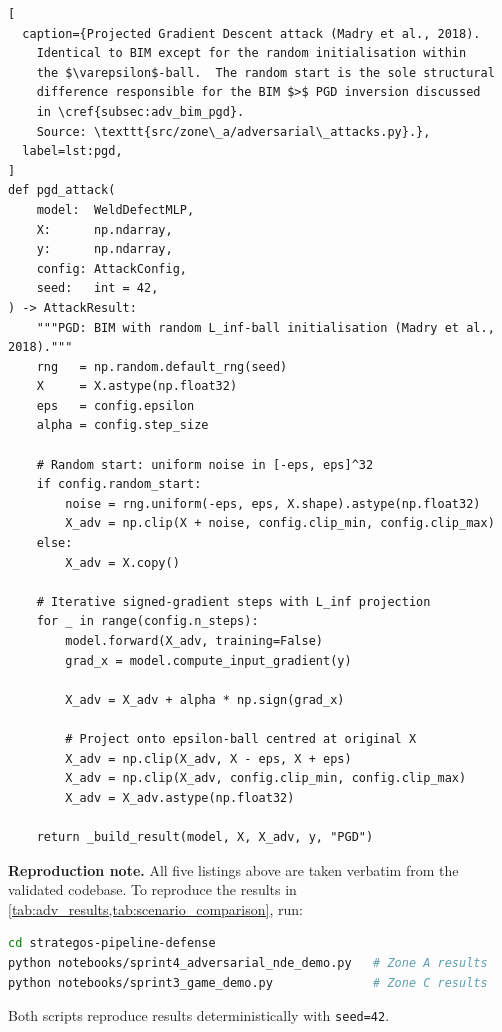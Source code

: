 \begin{lstlisting}[
  caption={Projected Gradient Descent attack (Madry et al., 2018).
    Identical to BIM except for the random initialisation within
    the $\varepsilon$-ball.  The random start is the sole structural
    difference responsible for the BIM $>$ PGD inversion discussed
    in \cref{subsec:adv_bim_pgd}.
    Source: \texttt{src/zone\_a/adversarial\_attacks.py}.},
  label=lst:pgd,
]
def pgd_attack(
    model:  WeldDefectMLP,
    X:      np.ndarray,
    y:      np.ndarray,
    config: AttackConfig,
    seed:   int = 42,
) -> AttackResult:
    """PGD: BIM with random L_inf-ball initialisation (Madry et al., 2018)."""
    rng   = np.random.default_rng(seed)
    X     = X.astype(np.float32)
    eps   = config.epsilon
    alpha = config.step_size

    # Random start: uniform noise in [-eps, eps]^32
    if config.random_start:
        noise = rng.uniform(-eps, eps, X.shape).astype(np.float32)
        X_adv = np.clip(X + noise, config.clip_min, config.clip_max)
    else:
        X_adv = X.copy()

    # Iterative signed-gradient steps with L_inf projection
    for _ in range(config.n_steps):
        model.forward(X_adv, training=False)
        grad_x = model.compute_input_gradient(y)

        X_adv = X_adv + alpha * np.sign(grad_x)

        # Project onto epsilon-ball centred at original X
        X_adv = np.clip(X_adv, X - eps, X + eps)
        X_adv = np.clip(X_adv, config.clip_min, config.clip_max)
        X_adv = X_adv.astype(np.float32)

    return _build_result(model, X, X_adv, y, "PGD")
\end{lstlisting}

\vspace{1em}
\noindent\textbf{Reproduction note.}
All five listings above are taken verbatim from the validated codebase.
To reproduce the results in \cref{tab:adv_results,tab:scenario_comparison},
run:
\begin{lstlisting}[language=bash, numbers=none, frame=none, backgroundcolor=\color{white}]
cd strategos-pipeline-defense
python notebooks/sprint4_adversarial_nde_demo.py   # Zone A results
python notebooks/sprint3_game_demo.py              # Zone C results
\end{lstlisting}
Both scripts reproduce results deterministically with \texttt{seed=42}.

